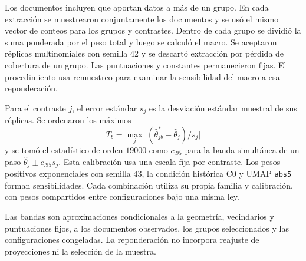 Los  documentos incluyen  que aportan datos a más de un grupo. En cada extracción se muestrearon conjuntamente los documentos y se usó el mismo vector de conteos para los grupos y contrastes. Dentro de cada grupo se dividió la suma ponderada por el peso total y luego se calculó el macro. Se aceptaron  réplicas multinomiales con semilla 42 y se descartó  extracción por pérdida de cobertura de un grupo. Las puntuaciones y constantes permanecieron fijas. El procedimiento usa remuestreo \parencite{efron1979} para examinar la sensibilidad del macro a esa reponderación.

Para el contraste $j$, el error estándar $s_j$ es la desviación estándar muestral de sus réplicas. Se ordenaron los máximos
\[
 T_b=\max_j\big|(\hat\theta_{jb}^{*}-\hat\theta_j)/s_j\big|
\]
y se tomó el estadístico de orden $19000$ como $c_{.95}$ para la banda simultánea de un paso $\hat\theta_j\pm c_{.95}s_j$. Esta calibración usa una escala fija por contraste. Los pesos positivos exponenciales con semilla 43, la condición histórica C0 y UMAP \texttt{abs5} forman sensibilidades. Cada combinación utiliza su propia familia y calibración, con pesos compartidos entre configuraciones bajo una misma ley.

Las bandas son aproximaciones condicionales a la geometría, vecindarios y puntuaciones fijos, a los documentos observados, los grupos seleccionados y las configuraciones congeladas. La reponderación no incorpora reajuste de proyecciones ni la selección de la muestra.
